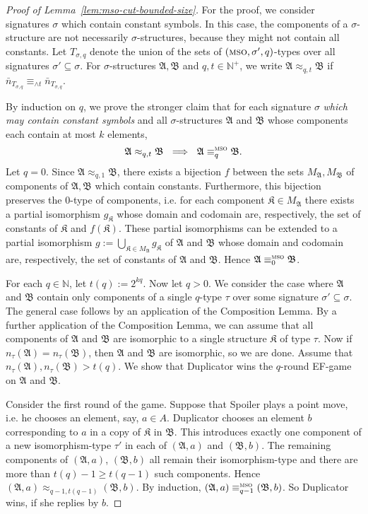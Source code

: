 \documentclass[11pt]{article}
\newcommand{\logic}[1]{\textsc{#1}}
\newcommand{\MSO}{\logic{mso}}
\newcommand{\eleq}[1][]{\equiv_{#1}}
\newcommand{\msoeleq}[1][]{\eleq[#1]^{\MSO{}}}
\newcommand{\maxeq}[1]{\equiv_{{\wedge}#1}}
\newcommand{\struct}[1]{\mathfrak{#1}}
\newcommand{\AS}{\struct{A}}
\newcommand{\BS}{\struct{B}}
\newcommand{\KS}{\struct{K}}
\newcommand{\N}{\mathbb{N}}
\newcommand{\Npos}{\mathbb{N}^{+}}
\newcommand{\bigunion}{\bigcup}
\begin{document}
\begin{proof}[Proof of Lemma~\ref{lem:mso-cut-bounded-size}]
  For the proof, we consider signatures $\sigma$ which contain
  constant symbols. In this case, the components of a
  $\sigma$-structure are not necessarily $\sigma$-structures, because
  they might not contain all constants. Let $T_{\sigma,q}$ denote the
  union of the sets of $(\MSO,\sigma',q)$-types over all signatures $\sigma' \subseteq \sigma$. For $\sigma$-structures $\AS,\BS$
  and $q,t\in \Npos$, we write $\AS \approx_{q,t} \BS$ if $\bar
  n_{T_{\sigma,q}} \maxeq{t} \bar n_{T_{\sigma,q}}$.

  By induction on $q$, we prove the stronger claim that for each
  signature $\sigma$ \emph{which may contain constant symbols} and all
  $\sigma$-structures $\AS$ and $\BS$ whose components each contain at
  most $k$ elements,
  \[ \AS \approx_{q,t} \BS \ \implies \ \AS \msoeleq[q] \BS. \] Let
  $q=0$. Since $\AS \approx_{q,1} \BS$, there exists a bijection $f$
  between the sets $M_\AS, M_\BS$ of components of $\AS,\BS$ which
  contain constants. Furthermore, this bijection preserves the
  $0$-type of components, i.e. for each component $\KS\in M_\AS$ there
  exists a partial isomorphism $g_\KS$ whose domain and codomain are,
  respectively, the set of constants of $\KS$ and $f(\KS)$. These
  partial isomorphisms can be extended to a partial isomorphism $g :=
  \bigunion_{\KS\in M_\AS} g_\KS$ of $\AS$ and $\BS$ whose domain and
  codomain are, respectively, the set of constants of $\AS$ and
  $\BS$. Hence $\AS \msoeleq[0] \BS$.

  For each $q\in \N$, let $t(q):=2^{kq}$. Now let $q>0$. We consider
  the case where $\AS$ and $\BS$ contain only components of a single
  $q$-type $\tau$ over some signature $\sigma'\subseteq \sigma$. The
  general case follows by an application of the Composition Lemma. By
  a further application of the Composition Lemma, we can assume that
  all components of $\AS$ and $\BS$ are isomorphic to a single
  structure $\KS$ of type $\tau$. Now if $n_\tau(\AS)=n_\tau(\BS)$,
  then $\AS$ and $\BS$ are isomorphic, so we are done. Assume that
  $n_\tau(\AS), n_\tau(\BS) > t(q)$. We show that Duplicator wins the
  $q$-round EF-game on $\AS$ and $\BS$.
  
  Consider the first round of the game. Suppose that Spoiler plays a
  point move, i.e. he chooses an element, say, $a\in A$. Duplicator
  chooses an element $b$ corresponding to $a$ in a copy of $\KS$ in
  $\BS$. This introduces exactly one component of a new
  isomorphism-type $\tau'$ in each of $(\AS,a)$ and $(\BS,b)$. The
  remaining components of $(\AS,a)$, $(\BS,b)$ all remain their
  isomorphism-type and there are more than $t(q)-1 \geq t(q-1)$ such
  components. Hence $(\AS,a) \approx_{q-1,t(q-1)} (\BS,b)$. By
  induction, $(\AS,a) \msoeleq[q-1] (\BS,b)$. So Duplicator wins, if
  she replies by $b$.


\end{proof}
\end{document}
